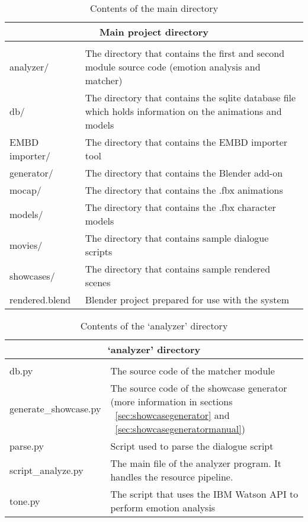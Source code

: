 \begin{table}[H]
	\centering
	\small
	
	\begin{tabular}{ |p{8.5em}|p{30.1em}| }
		\hline
		\multicolumn{2}{|c|}{\textbf{Main project directory}} \\
		\hline
		\thead{Item} & \thead{Description} \\
		\hline
		analyzer/ & The directory that contains the first and second module source code (emotion analysis and matcher) \\
		\hline
		db/ & The directory that contains the sqlite database file which holds information on the animations and models \\
		\hline
		EMBD importer/ & The directory that contains the EMBD importer tool \\
		\hline
		generator/ & The directory that contains the Blender add-on \\
		\hline
		mocap/ & The directory that contains the .fbx animations \\
		\hline
		models/ & The directory that contains the .fbx character models \\
		\hline
		movies/ & The directory that contains sample dialogue scripts \\
		\hline
		showcases/ & The directory that contains sample rendered scenes \\
		\hline
		rendered.blend & Blender project prepared for use with the system \\
		\hline
	\end{tabular}
	
	\caption{Contents of the main directory}
	\label{tab:maindirectory}
\end{table}

\begin{table}[H]
	\centering
	\small
	
	\begin{tabular}{ |p{8.5em}|p{30.1em}| }
		\hline
		\multicolumn{2}{|c|}{\textbf{`analyzer' directory}} \\
		\hline
		\thead{Item} & \thead{Description} \\
		\hline
		db.py & The source code of the matcher module \\
		\hline
		generate\_showcase.py & The source code of the showcase generator (more information in sections ~\ref{sec:showcasegenerator} and ~\ref{sec:showcasegeneratormanual}) \\
		\hline
		parse.py & Script used to parse the dialogue script \\
		\hline
		script\_analyze.py & The main file of the analyzer program. It handles the resource pipeline. \\
		\hline
		tone.py & The script that uses the IBM Watson API to perform emotion analysis \\
		\hline
	\end{tabular}
	
	\caption{Contents of the `analyzer' directory}
	\label{tab:analyzerdirectory}
\end{table}

